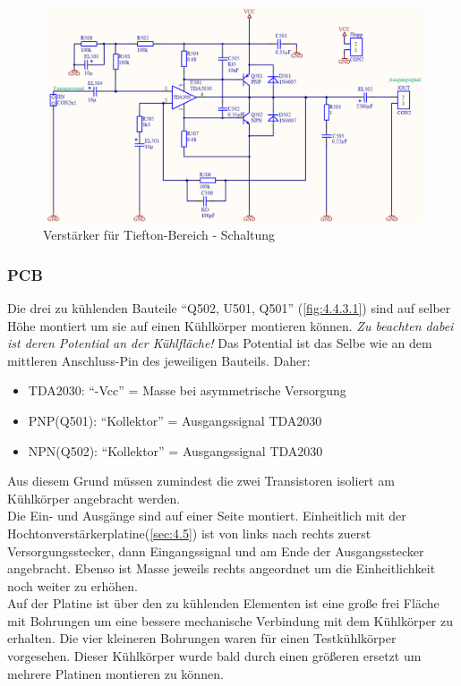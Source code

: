 \begin{figure} [H]
	\centering	
	\includegraphics[width=1\textwidth]{img/Print5/5_TTVerstaerker-Schem.PNG}
	\caption{Verstärker für Tiefton-Bereich - Schaltung}
	\label {fig:4.4.2.1}
\end{figure}


\subsubsection{PCB}\label{subsec:4.4.3}
Die drei zu kühlenden Bauteile \enquote{Q502, U501, Q501} (\ref{fig:4.4.3.1}) sind auf selber Höhe montiert um sie auf einen Kühlkörper montieren können.
\emph{Zu beachten dabei ist deren Potential an der Kühlfläche!}
Das Potential ist das Selbe wie an dem mittleren Anschluss-Pin des jeweiligen Bauteils.
Daher:
\begin{itemize}
	\item TDA2030: \enquote{-Vcc} = Masse bei asymmetrische Versorgung
	\item PNP(Q501): \enquote{Kollektor} = Ausgangssignal TDA2030
	\item NPN(Q502): \enquote{Kollektor} = Ausgangssignal TDA2030
\end{itemize}

Aus diesem Grund müssen zumindest die zwei Transistoren isoliert am Kühlkörper angebracht werden.\\
Die Ein- und Ausgänge sind auf einer Seite montiert. 
Einheitlich mit der Hochtonverstärkerplatine(\ref{sec:4.5}) ist von links nach rechts zuerst Versorgungsstecker, dann Eingangssignal und am Ende der Ausgangsstecker angebracht.
Ebenso ist Masse jeweils rechts angeordnet um die Einheitlichkeit noch weiter zu erhöhen.\\
Auf der Platine ist über den zu kühlenden Elementen ist eine große frei Fläche mit Bohrungen um eine bessere mechanische Verbindung mit dem Kühlkörper zu erhalten.
Die vier kleineren Bohrungen waren für einen Testkühlkörper vorgesehen. 
Dieser Kühlkörper wurde bald durch einen größeren ersetzt um mehrere Platinen montieren zu können.

